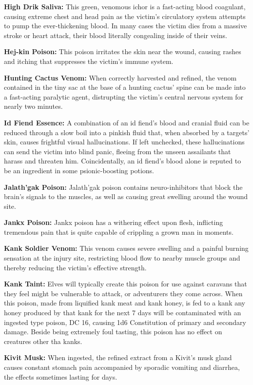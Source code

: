 \textbf{High Drik Saliva:} This green, venomous ichor is a fast-acting blood coagulant, causing extreme chest and head pain as the victim's circulatory system attempts to pump the ever-thickening blood. In many cases the victim dies from a massive stroke or heart attack, their blood literally congealing inside of their veins.

\textbf{Hej-kin Poison:} This poison irritates the skin near the wound, causing rashes and itching that suppresses the victim's immune system.

\textbf{Hunting Cactus Venom:} When correctly harvested and refined, the venom contained in the tiny sac at the base of a hunting cactus' spine can be made into a fast-acting paralytic agent, distrupting the victim's central nervous system for nearly two minutes.

\textbf{Id Fiend Essence:} A combination of an id fiend's blood and cranial fluid can be reduced through a slow boil into a pinkish fluid that, when absorbed by a targets' skin, causes frightful visual hallucinations. If left unchecked, these hallucinations can send the victim into blind panic, fleeing from the unseen assailants that harass and threaten him. Coincidentally, an id fiend's blood alone is reputed to be an ingredient in some psionic-boosting potions.

\textbf{Jalath'gak Poison:} Jalath'gak poison contains neuro-inhibitors that block the brain's signals to the muscles, as well as causing great swelling around the wound site.

\textbf{Jankx Poison:} Jankx poison has a withering effect upon flesh, inflicting tremendous pain that is quite capable of crippling a grown man in moments.

\textbf{Kank Soldier Venom:} This venom causes severe swelling and a painful burning sensation at the injury site, restricting blood flow to nearby muscle groups and thereby reducing the victim's effective strength.

\textbf{Kank Taint:} Elves will typically create this poison for use against caravans that they feel might be vulnerable to attack, or adventurers they come across. When this poison, made from liquified kank meat and kank honey, is fed to a kank any honey produced by that kank for the next 7 days will be contaminated with an ingested type poison, DC 16, causing 1d6 Constitution of primary and secondary damage. Beside being extremely foul tasting, this poison has no effect on creatures other tha kanks.

\textbf{Kivit Musk:} When ingested, the refined extract from a Kivit's musk gland causes constant stomach pain accompanied by sporadic vomiting and diarrhea, the effects sometimes lasting for days.

